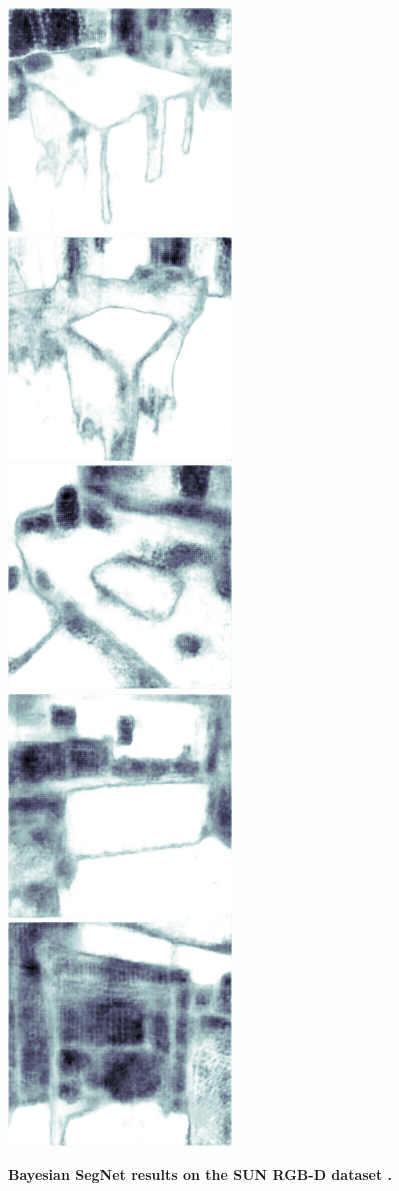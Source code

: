 \begin{figure}[p]
\begin{center}
{\includegraphics[height=0.125\linewidth]{BayesianSegNet/segnet_bayes_00375_uncertainty.png}
\includegraphics[height=0.125\linewidth]{BayesianSegNet/segnet_bayes_00461_uncertainty.png}
\includegraphics[height=0.125\linewidth]{BayesianSegNet/segnet_bayes_00116_uncertainty.png}
\includegraphics[height=0.125\linewidth]{BayesianSegNet/segnet_bayes_01035_uncertainty.png}
\includegraphics[height=0.125\linewidth]{BayesianSegNet/segnet_bayes_00856_uncertainty.png}
}
\end{center}
\label{fig:qual_sun}
\caption[Bayesian SegNet results on the SUN RGB-D dataset.]{\footnotesize \textbf{Bayesian SegNet results on the SUN RGB-D dataset \citep{song2015sun}.}}


\end{figure}

